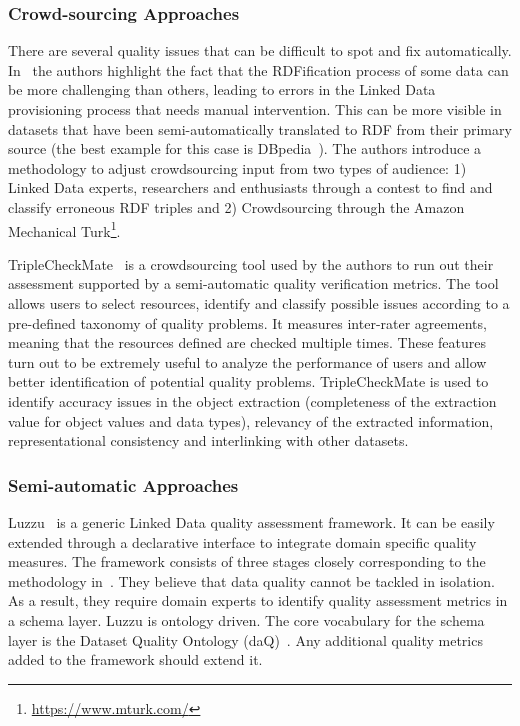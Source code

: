 \subsubsection{Crowd-sourcing Approaches}
There are several quality issues that can be difficult to spot and fix automatically. In~\cite{Acosta:ISWC:13} the authors highlight the fact that the RDFification process of some data can be more challenging than others, leading to errors in the Linked Data provisioning process that needs manual intervention. This can be more visible in datasets that have been semi-automatically translated to RDF from their primary source (the best example for this case is DBpedia~\cite{Bizer:WebSemJorunal:09}). The authors introduce a methodology to adjust crowdsourcing input from two types of audience: 1) Linked Data experts, researchers and enthusiasts through a contest to find and classify erroneous RDF triples and 2) Crowdsourcing through the Amazon Mechanical Turk\footnote{\url{https://www.mturk.com/}}.

TripleCheckMate~\cite{Kontokostas:KESW:13} is a crowdsourcing tool used by the authors to run out their assessment supported by a semi-automatic quality verification metrics. The tool allows users to select resources, identify and classify possible issues according to a pre-defined taxonomy of quality problems. It measures inter-rater agreements, meaning that the resources defined are checked multiple times. These features turn out to be extremely useful to analyze the performance of users and allow better identification of potential quality problems. TripleCheckMate is used to identify accuracy issues in the object extraction (completeness of the extraction value for object values and data types), relevancy of the extracted information, representational consistency and interlinking with other datasets.

\subsubsection{Semi-automatic Approaches}
Luzzu~\cite{Debattista:CoRR:14} is a generic Linked Data quality assessment framework. It can be easily extended through a declarative interface to integrate domain specific quality measures. The framework consists of three stages closely corresponding to the methodology in~\cite{Anisa:LDQ:14}. They believe that data quality cannot be tackled in isolation. As a result, they require domain experts to identify quality assessment metrics in a schema layer. Luzzu is ontology driven. The core vocabulary for the schema layer is the Dataset Quality Ontology (daQ)~\cite{Debattista:WWW:14}. Any additional quality metrics added to the framework should extend it.

